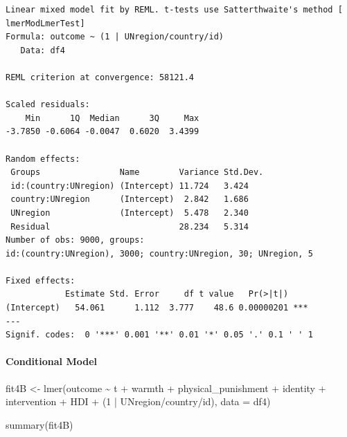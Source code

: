 \documentclass[
  letterpaper,
  DIV=11,
  numbers=noendperiod]{scrreprt}
\let\oldparagraph\paragraph
\renewcommand{\paragraph}[1]{\oldparagraph{#1}\mbox{}}
\newenvironment{Shaded}{\begin{snugshade}}{\end{snugshade}}
\newcommand{\AttributeTok}[1]{\textcolor[rgb]{0.40,0.45,0.13}{#1}}
\newcommand{\DecValTok}[1]{\textcolor[rgb]{0.68,0.00,0.00}{#1}}
\newcommand{\FunctionTok}[1]{\textcolor[rgb]{0.28,0.35,0.67}{#1}}
\newcommand{\NormalTok}[1]{\textcolor[rgb]{0.00,0.23,0.31}{#1}}
\newcommand{\OtherTok}[1]{\textcolor[rgb]{0.00,0.23,0.31}{#1}}
\newcommand{\SpecialCharTok}[1]{\textcolor[rgb]{0.37,0.37,0.37}{#1}}
\begin{document}
\begin{verbatim}
Linear mixed model fit by REML. t-tests use Satterthwaite's method [
lmerModLmerTest]
Formula: outcome ~ (1 | UNregion/country/id)
   Data: df4

REML criterion at convergence: 58121.4

Scaled residuals: 
    Min      1Q  Median      3Q     Max 
-3.7850 -0.6064 -0.0047  0.6020  3.4399 

Random effects:
 Groups                Name        Variance Std.Dev.
 id:(country:UNregion) (Intercept) 11.724   3.424   
 country:UNregion      (Intercept)  2.842   1.686   
 UNregion              (Intercept)  5.478   2.340   
 Residual                          28.234   5.314   
Number of obs: 9000, groups:  
id:(country:UNregion), 3000; country:UNregion, 30; UNregion, 5

Fixed effects:
            Estimate Std. Error     df t value   Pr(>|t|)    
(Intercept)   54.061      1.112  3.777    48.6 0.00000201 ***
---
Signif. codes:  0 '***' 0.001 '**' 0.01 '*' 0.05 '.' 0.1 ' ' 1
\end{verbatim}

\paragraph{Conditional Model}\label{conditional-model-1}

\begin{Shaded}
\begin{Highlighting}[]
\NormalTok{fit4B }\OtherTok{\textless{}{-}} \FunctionTok{lmer}\NormalTok{(outcome }\SpecialCharTok{\textasciitilde{}}\NormalTok{ t }\SpecialCharTok{+}\NormalTok{ warmth }\SpecialCharTok{+}\NormalTok{ physical\_punishment }\SpecialCharTok{+} 
\NormalTok{                identity }\SpecialCharTok{+}\NormalTok{ intervention }\SpecialCharTok{+}\NormalTok{ HDI }\SpecialCharTok{+} 
\NormalTok{                (}\DecValTok{1} \SpecialCharTok{|}\NormalTok{ UNregion}\SpecialCharTok{/}\NormalTok{country}\SpecialCharTok{/}\NormalTok{id),}
              \AttributeTok{data =}\NormalTok{ df4)}

\FunctionTok{summary}\NormalTok{(fit4B)}
\end{Highlighting}
\end{Shaded}
\end{document}
